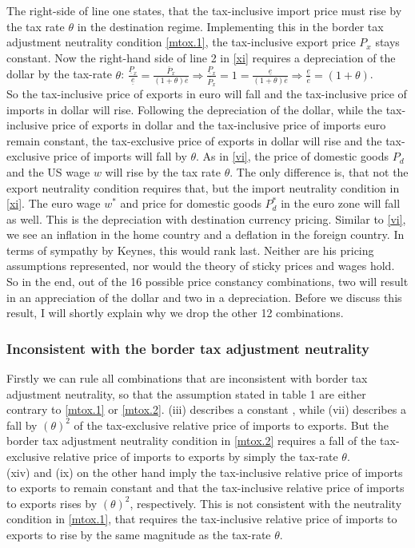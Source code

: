 The right-side of line one states, that the tax-inclusive import price must rise by the tax rate $\theta$ in the destination regime. Implementing this in the border tax adjustment neutrality condition \eqref{mtox.1}, the tax-inclusive export price $P_x$ stays constant. Now the right-hand side of line 2 in \eqref{xi} requires a depreciation of the dollar by the tax-rate $\theta$: $\frac{\underline P_x}{\underline e} = \frac{\overline P_x}{(1+\theta)\overline e} \Rightarrow \frac{\underline P_x}{\overline P_x} = 1 = \frac{\underline e}{(1+\theta)\overline e} \Rightarrow \frac{\underline e}{\overline e} = (1+\theta)$.\\
So the tax-inclusive price of exports in euro will fall and the tax-inclusive price of imports in dollar will rise. Following the depreciation of the dollar, while the tax-inclusive price of exports in dollar and the tax-inclusive price of imports euro remain constant, the tax-exclusive price of exports in dollar will rise and the tax-exclusive price of imports will fall by $\theta$.
As in \eqref{vi}, the price of domestic goods $P_d$ and the US wage $w$ will rise by the tax rate $\theta$. The only difference is, that not the export neutrality condition requires that, but the import neutrality condition in \eqref{xi}. The euro wage $w^*$ and price for domestic goods $P_d^*$ in the euro zone will fall as well. This is the depreciation with destination currency pricing. Similar to \eqref{vi}, we see an inflation in the home country and a deflation in the foreign country. In terms of sympathy by Keynes, this would rank last. Neither are his pricing assumptions represented, nor would the theory of sticky prices and wages hold. \\

So in the end, out of the 16 possible price constancy combinations, two will result in an appreciation of the dollar and two in a depreciation. Before we discuss this result, I will shortly explain why we drop the other 12 combinations.

\subsubsection{Inconsistent with the border tax adjustment neutrality}
Firstly we can rule all combinations that are inconsistent with border tax adjustment neutrality, so that the assumption stated in table 1 are either contrary to \eqref{mtox.1} or \eqref{mtox.2}. (iii) describes a constant , while (vii) describes a fall by $(\theta)^2$ of the tax-exclusive relative price of imports to exports. But the border tax adjustment neutrality condition in \eqref{mtox.2} requires a fall of the tax-exclusive relative price of imports to exports by simply the tax-rate $\theta$.  \\
(xiv) and (ix) on the other hand imply the tax-inclusive relative price of imports to exports to remain constant and that the tax-inclusive relative price of imports to exports rises by $(\theta)^2$, respectively. This is not consistent with the neutrality condition in \eqref{mtox.1}, that requires the tax-inclusive relative price of imports to exports to rise by the same magnitude as the tax-rate $\theta$.

